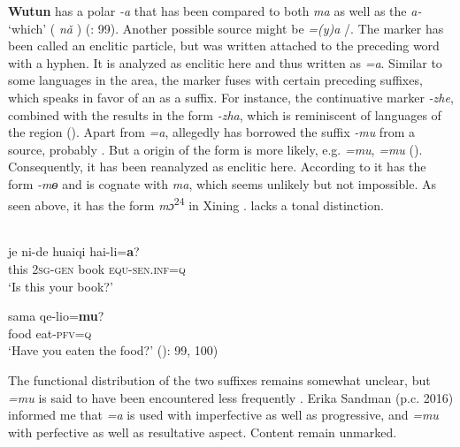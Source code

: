 \textbf{Wutun} has a polar  \textit{-a} that has been compared to both  \textit{ma}  as well as the  \textit{a-} ‘which’ ( \textit{nǎ} ) (\citealt{Janhunen2008}: 99). Another possible source might be  \textit{=(y)a} /. The marker has been called an enclitic particle, but was written attached to the preceding word with a hyphen. It is analyzed as enclitic here and thus written as \textit{=a}. Similar to some  languages in the area, the marker fuses with certain preceding suffixes, which speaks in favor of an  as a suffix. For instance, the continuative marker \textit{-zhe}, combined with the  results in the form \textit{-zha}, which is reminiscent of  languages of the region (). Apart from \textit{=a},  allegedly has borrowed the suffix \textit{-mu} from a  source, probably  \citep[384]{Sandman2012}. But a  origin of the  form is more likely, e.g.  \textit{=mu},  \textit{=mu} (). Consequently, it has been reanalyzed as enclitic here. According to \citet[894]{Lee-SmithWurm1996} it has the form \textit{-mɵ} and is cognate with  \textit{ma}, which seems unlikely but not impossible. As seen above, it has the form \textit{mɔ}\textsuperscript{24} in Xining .  lacks a tonal distinction.

\ea%
    \label{ex:trans:26}
    \\
    \ea
    \gll je  ni-de    huaiqi    hai-li=\textbf{{a}}?\\
    this  2\textsc{sg}-\textsc{gen}  book    \textsc{equ}-\textsc{sen.}\textsc{inf}=\textsc{q}\\
    \glt ‘Is this your book?’
    
    \ex
    \gll sama    qe-lio=\textbf{{mu}}?\\
    food    eat-\textsc{pfv=q}\\
    \glt ‘Have you eaten the food?’ (\citealt{Janhunen2008}): 99, 100)
    \z
    \z

The functional distribution of the two suffixes remains somewhat unclear, but \textit{=mu} is said to have been encountered less frequently \citep{Janhunen2008}. Erika Sandman (p.c. 2016) informed me that \textit{=a} is used with imperfective as well as progressive, and \textit{=mu} with perfective as well as resultative aspect. Content  remain unmarked.

